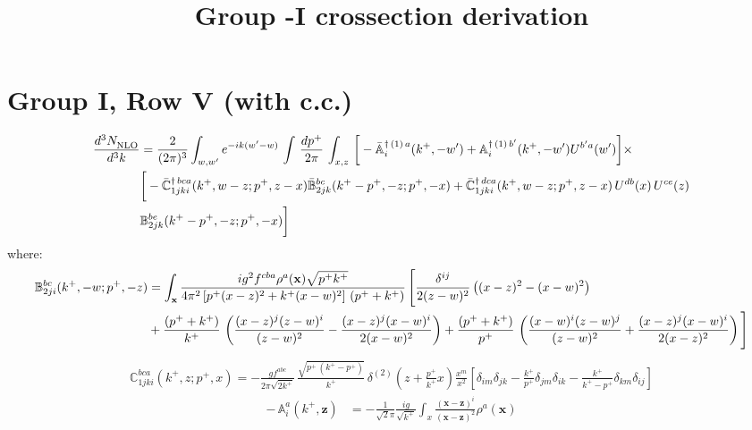 \documentclass[9pt]{article}
\title{Group -I crossection derivation}
\author{}
\date{}
\def\mf#1{\mathbb{#1}}
\numberwithin{equation}{section}
\begin{document}
\maketitle
\section{Group I, Row V (with c.c.)}
\begin{align}
    \frac{d^{3}N_{\rm NLO}^{\rm}}{d^{3}k}  & = \frac{2}{(2\pi)^{3}}  \int_{w, w^\prime} e^{-ik(w^\prime-w)}\, \int\, \frac{dp^{+}}{2\pi}\,\int_{x,z}\, \bigg[-\bar{\mf{A}}^{\dagger\,(1)\,a}_{i}(k^{+},-w^{\prime})+\mf{A}^{\dagger\, (1)\, b^{\prime}}_{i}(k^{+},-w^{\prime})U^{b^{\prime}a}(w^{\prime})\bigg]\times\notag \\ & \bigg[-\Bar{\mf{C}}^{\dagger\, bca}_{1jki}(k^{+},w-z;p^{+},z-x)\Bar{\mf{B}}^{bc}_{2jk}(k^{+}-p^{+},- z;p^{+},-x)+\bar{\mf{C}}^{\dagger\, dca}_{1jki}(k^+,w-z; p^+, z-x)\,U^{db}(x)\,U^{ce}(z) \notag \\ & {\mf{B}}^{be}_{2jk} (k^{+}-p^+, -z; p^+, -x) \bigg]\nonumber
\end{align}
where:
\begin{align}
     \mf{B}^{bc}_{2ji}(k^{+}, -w; p^{+}, -z) & =    \int_{\mathbf{x}}\frac{ig^{2}f^{cba}\rho^{a}(\mathbf{x})\sqrt{p^{+}k^{+}}}{4\pi^{2}\left[p^{+}(x-z)^{2}+k^{+} (x-w)^{2}\right]\,(p^{+}+k^{+})}\,\Bigg[\frac{\delta^{ij}}{2(z-w)^{2}}\left((x-z)^{2}-(x-w)^{2}\right)\notag \\ & +\frac{(p^{+}+k^{+})}{k^{+}}\,\left(\frac{(x-z)^{j}(z-w)^{i}}{(z-w)^{2}}-\frac{(x-z)^{j}(x-w)^{i}}{2(x-w)^{2}}\right) +\frac{(p^{+}+k^{+})}{p^{+}}\,\left(\frac{(x-w)^{i}(z-w)^{j}}{(z-w)^{2}} +\frac{(x-z)^{j}(x-w)^{i}}{2(x-z)^{2}}\right)\Bigg]
\end{align}
\begin{align}
   \mf{C}^{bca}_{1jki}(k^{+},z; p^{+},x) = -\frac{gf^{abc}}{2\pi \sqrt{2k^{+}}}\,\frac{\sqrt{p^{+}\,(k^{+}-p^{+})}}{k^{+}}\, \delta^{(2)}\left(z+\frac{p^{+}}{k^{+}} x\right)\frac{x^{m}}{x^{2}}\left[ \delta_{im} \delta_{jk}
     - \frac{k^{+}}{p^{+}}\delta_{jm} \delta_{ik}
   - \frac{k^{+}}{k^{+}-p^{+}} \delta_{km}\delta_{ij}
 \right]
\end{align}
\begin{align}
\label{A1coeff}
  -\, \mf{A}^{a}_{i}(k^{+},\mathbf{z})  & = - \frac{1}{\sqrt{2}\pi}\frac{ig}{\sqrt{k^+}}\int_{x}\frac{(\mathbf{x}-\mathbf{z})^{i}}{(\mathbf{x}-\mathbf{z})^{2}} \rho^{a}(\mathbf{x}) 
\end{align}
\end{document}

